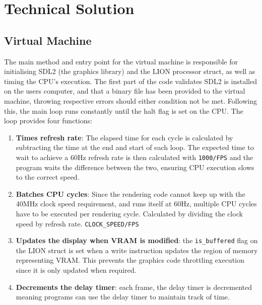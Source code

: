 \section{Technical Solution}



\subsection{Virtual Machine}

The main method and entry point for the virtual machine is responsible for initialising SDL2 (the graphics library) and the LION processor struct, as well as timing the CPU's execution. The first part of the code validates SDL2 is installed on the users computer, and that a binary file has been provided to the virtual machine, throwing respective errors should either condition not be met. Following this, the main loop runs constantly until the halt flag is set on the CPU. The loop provides four functions:

\begin{enumerate}
    \item \textbf{Times refresh rate}: The elapsed time for each cycle is calculated by subtracting the time at the end and start of each loop. The expected time to wait to achieve a 60Hz refresh rate is then calculated with \texttt{1000/FPS} and the program waits the difference between the two, ensuring CPU execution slows to the correct speed.
    \item \textbf{Batches CPU cycles}: Since the rendering code cannot keep up with the 40MHz clock speed requirement, and runs itself at 60Hz, multiple CPU cycles have to be executed per rendering cycle. Calculated by dividing the clock speed by refresh rate. \texttt{CLOCK\_SPEED/FPS}
    \item \textbf{Updates the display when VRAM is modified}: the \texttt{is\_buffered} flag on the LION struct is set when a write instruction updates the region of memory representing VRAM. This prevents the graphics code throttling execution since it is only updated when required. 
    \item \textbf{Decrements the delay timer}: each frame, the delay timer is decremented meaning programs can use the delay timer to maintain track of time.
\end{enumerate}

